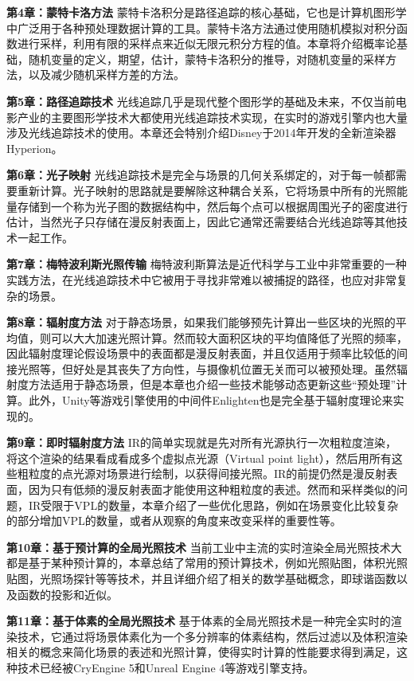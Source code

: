 \textbf{第4章：蒙特卡洛方法 } 蒙特卡洛积分是路径追踪的核心基础，它也是计算机图形学中广泛用于各种预处理数据计算的工具。蒙特卡洛方法通过使用随机模拟对积分函数进行采样，利用有限的采样点来近似无限元积分方程的值。本章将介绍概率论基础，随机变量的定义，期望，估计，蒙特卡洛积分的推导，对随机变量的采样方法，以及减少随机采样方差的方法。

\textbf{第5章：路径追踪技术 } 光线追踪几乎是现代整个图形学的基础及未来，不仅当前电影产业的主要图形学技术大都使用光线追踪技术实现，在实时的游戏引擎内也大量涉及光线追踪技术的使用。本章还会特别介绍Disney于2014年开发的全新渲染器Hyperion。

\textbf{第6章：光子映射 } 光线追踪技术是完全与场景的几何关系绑定的，对于每一帧都需要重新计算。光子映射的思路就是要解除这种耦合关系，它将场景中所有的光照能量存储到一个称为光子图的数据结构中，然后每个点可以根据周围光子的密度进行估计，当然光子只存储在漫反射表面上，因此它通常还需要结合光线追踪等其他技术一起工作。

\textbf{第7章：梅特波利斯光照传输 } 梅特波利斯算法是近代科学与工业中非常重要的一种实践方法，在光线追踪技术中它被用于寻找非常难以被捕捉的路径，也应对非常复杂的场景。


\textbf{第8章：辐射度方法 } 对于静态场景，如果我们能够预先计算出一些区块的光照的平均值，则可以大大加速光照计算。然而较大面积区块的平均值降低了光照的频率，因此辐射度理论假设场景中的表面都是漫反射表面，并且仅适用于频率比较低的间接光照等，但好处是其丧失了方向性，与摄像机位置无关而可以被预处理。虽然辐射度方法适用于静态场景，但是本章也介绍一些技术能够动态更新这些“预处理”计算。此外，Unity等游戏引擎使用的中间件Enlighten也是完全基于辐射度理论来实现的。


\textbf{第9章：即时辐射度方法 } IR的简单实现就是先对所有光源执行一次粗粒度渲染，将这个渲染的结果看成看成多个虚拟点光源（Virtual point light），然后用所有这些粗粒度的点光源对场景进行绘制，以获得间接光照。IR的前提仍然是漫反射表面，因为只有低频的漫反射表面才能使用这种粗粒度的表述。然而和采样类似的问题，IR受限于VPL的数量，本章介绍了一些优化思路，例如在场景变化比较复杂的部分增加VPL的数量，或者从观察的角度来改变采样的重要性等。

\textbf{第10章：基于预计算的全局光照技术 } 当前工业中主流的实时渲染全局光照技术大都是基于某种预计算的，本章总结了常用的预计算技术，例如光照贴图，体积光照贴图，光照场探针等等技术，并且详细介绍了相关的数学基础概念，即球谐函数以及函数的投影和近似。

\textbf{第11章：基于体素的全局光照技术 } 基于体素的全局光照技术是一种完全实时的渲染技术，它通过将场景体素化为一个多分辨率的体素结构，然后过滤以及体积渲染相关的概念来简化场景的表述和光照计算，使得实时计算的性能要求得到满足，这种技术已经被CryEngine 5和Unreal Engine 4等游戏引擎支持。
	
